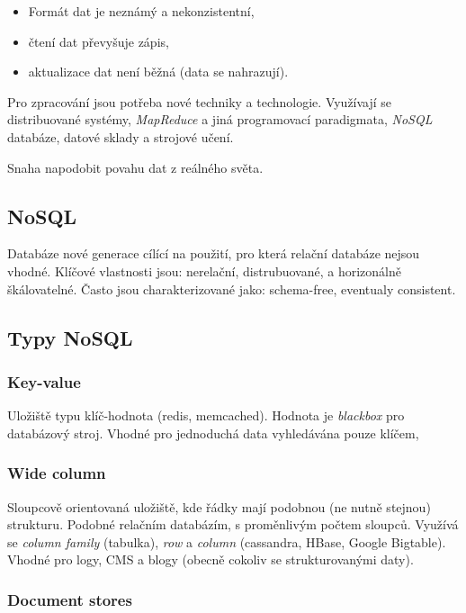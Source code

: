 \begin{itemize}
    \item Formát dat je neznámý a nekonzistentní,
    \item čtení dat převyšuje zápis,
    \item aktualizace dat není běžná (data se nahrazují).
\end{itemize}

Pro zpracování jsou potřeba nové techniky a technologie.
Využívají se distribuované systémy, \textit{MapReduce} a jiná programovací paradigmata, \textit{NoSQL} databáze, datové sklady a strojové učení.

Snaha napodobit povahu dat z reálného světa.

\subsection*{NoSQL}

Databáze nové generace cílící na použití, pro která relační databáze nejsou vhodné.
Klíčové vlastnosti jsou: nerelační, distrubuované, a horizonálně škálovatelné.
Často jsou charakterizované jako: schema-free, eventualy consistent.

\subsection*{Typy NoSQL}

\subsubsection*{Key-value}

Uložiště typu klíč-hodnota (redis, memcached).
Hodnota je \textit{blackbox} pro databázový stroj.
Vhodné pro jednoduchá data vyhledávána pouze klíčem,
    
\subsubsection*{Wide column}

Sloupcově orientovaná uložiště, kde řádky mají podobnou (ne nutně stejnou) strukturu.
Podobné relačním databázím, s proměnlivým počtem sloupců.
Využívá se \textit{column family} (tabulka), \textit{row} a \textit{column} (cassandra, HBase, Google Bigtable).
Vhodné pro logy, CMS a blogy (obecně cokoliv se strukturovanými daty).

\subsubsection*{Document stores}

